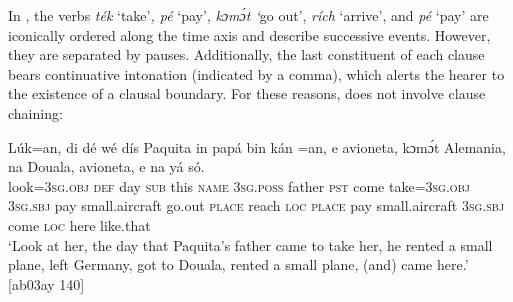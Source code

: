 In , the verbs \textit{ték} ‘take’\textit{, pé} ‘pay’,\textit{ kɔmɔ́t ‘}go out’,\textit{ rích} ‘arrive’, and \textit{pé} ‘pay’ are iconically ordered along the time axis and describe successive events. However, they are separated by pauses. Additionally, the last constituent of each clause bears continuative intonation (indicated by a comma), which alerts the hearer to the existence of a clausal boundary. For these reasons,  does not involve clause chaining: 



\ea%
    \label{ex:key:1612}
    \gll Lúk=an,    di  dé  wé  dís  Paquita  in    papá  bin  kán    =an,
e      avioneta,      kɔmɔ́t  Alemania,      na  Douala,
  avioneta,      e        na  yá    só.\\
look=\textsc{3sg.obj}  \textsc{def}  day  \textsc{sub}  this  \textsc{name}  \textsc{3sg.poss}  father  \textsc{pst}  come  take=\textsc{3sg.obj}
\textsc{3sg.sbj}  pay  small.aircraft    go.out  \textsc{place}    reach  \textsc{loc}  \textsc{place}
pay  small.aircraft    \textsc{3sg.sbj}  come  \textsc{loc}  here    like.that\\

\glt ‘Look at her, the day that Paquita’s father came to take her, he rented a small plane, 
left Germany, got to Douala, rented a small plane, (and) came here.’ [ab03ay 140]
\z

